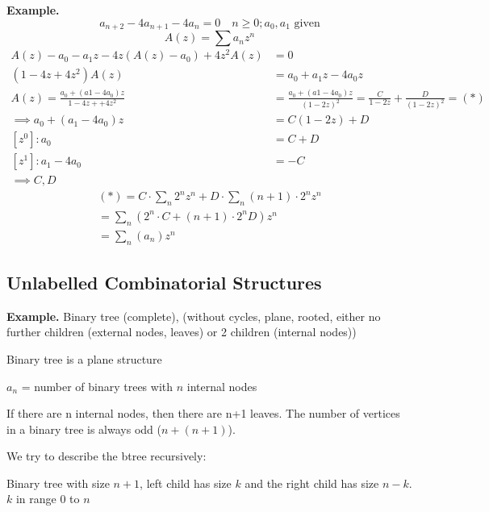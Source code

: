 \textbf{Example.}
\[
    a_{n+2} - 4 a_{n+1} - 4 a_n = 0 \quad n ≥ 0;  a_0, a_1 \text{ given} 
\]
\[
    A(z) = \sum a_n z^n 
\]
\begin{align*}
    A(z) - a_0 - a_1 z - 4z (A(z)-a_0) + 4z^2 A(z) &= 0 \\
    (1-4z + 4z^2) A(z) &= a_0 + a_1 z - 4a_0 z \\
    A(z) = \frac{a_0 + (a1 - 4a_0)z}{1- 4z + + 4z^2} &= \frac{a_0 + (a1 - 4a_0)z}{(1-2z)^2}
    = \frac{C}{1-2z} + \frac{D}{(1-2z)^2} = (*)\\
    \implies a_0 + (a_1 - 4a_0)z &= C (1-2z) + D \\
    [z^0]: a_0 &= C+D \\
    [z^1]: a_1 - 4a_0 &= -C \\
    \implies C, D 
\end{align*}
\begin{align*}
    (*) = C \cdot \sum_n 2^n z^n + D \cdot \sum_n (n+1) \cdot 2^n z^n \\
    = \sum_n \left(2^n \cdot C + (n+1)\cdot 2^n D\right) z^n \\
    = \sum_n (a_n) z^n 
\end{align*}




\subsection*{Unlabelled Combinatorial Structures}

\textbf{Example.}
Binary tree (complete), (without cycles, plane, rooted, either no further children (external nodes, leaves) or 2 children (internal nodes))


Binary tree is a plane structure

$a_n$ = number of binary trees with $n$ internal nodes

If there are n internal nodes, then there are n+1 leaves. The number of vertices in a binary tree is always odd ($n + (n+1)$). 

We try to describe the btree recursively:

Binary tree with size $n+1$,
left child has size $k$ and the right child has size $n-k$. 
$k$ in range $0$ to $n$

